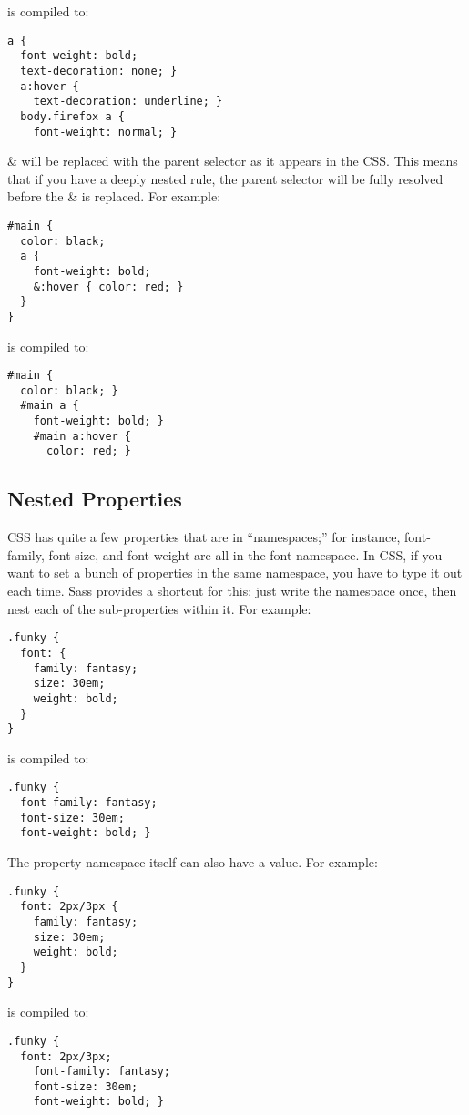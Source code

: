 \documentclass[9pt]{article}
\begin{document}
 is compiled to:
\begin{verbatim}
a {
  font-weight: bold;
  text-decoration: none; }
  a:hover {
    text-decoration: underline; }
  body.firefox a {
    font-weight: normal; }
\end{verbatim}


 \& will be replaced with the parent selector as it appears in the CSS. This means that if you have a deeply nested rule, the parent selector will be fully resolved before the \& is replaced. For example:
\begin{verbatim}
#main {
  color: black;
  a {
    font-weight: bold;
    &:hover { color: red; }
  }
}
\end{verbatim}


 is compiled to:
\begin{verbatim}
#main {
  color: black; }
  #main a {
    font-weight: bold; }
    #main a:hover {
      color: red; }
\end{verbatim}
\subsection{Nested Properties}


 CSS has quite a few properties that are in “namespaces;” for instance, font-family, font-size, and font-weight are all in the font namespace. In CSS, if you want to set a bunch of properties in the same namespace, you have to type it out each time. Sass provides a shortcut for this: just write the namespace once, then nest each of the sub-properties within it. For example:
\begin{verbatim}
.funky {
  font: {
    family: fantasy;
    size: 30em;
    weight: bold;
  }
}
\end{verbatim}


 is compiled to:
\begin{verbatim}
.funky {
  font-family: fantasy;
  font-size: 30em;
  font-weight: bold; }
\end{verbatim}


 The property namespace itself can also have a value. For example:
\begin{verbatim}
.funky {
  font: 2px/3px {
    family: fantasy;
    size: 30em;
    weight: bold;
  }
}
\end{verbatim}


 is compiled to:
\begin{verbatim}
.funky {
  font: 2px/3px;
    font-family: fantasy;
    font-size: 30em;
    font-weight: bold; }
\end{verbatim}
\end{document}
